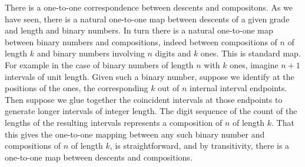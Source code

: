 \documentclass[5p,twocolumn]{elsarticle}
\begin{document}
\begin{remark}\label{rmk:descentsand compositions}
There is a one-to-one correspondence between descents and compositons. As we have seen, there is a natural one-to-one map between descents of a given grade and length and binary numbers.
In turn there is a natural one-to-one map between binary numbers and compositions, indeed between compositions of $n$ of length $k$ and binary numbers involving $n$ digits and $k$ ones.
This is standard map. For example in the case of binary numbers of length $n$ with $k$ ones, imagine $n+1$ intervals of unit length.
Given such a binary number, suppose we identify at the positions of the ones, the corresponding $k$ out of $n$ internal interval endpoints.
Then suppose we glue together the coincident intervals at those endpoints to generate longer intervals of integer length.
The digit sequence of the count of the lengths of the resulting intervals represents a composition of $n$ of length $k$.
That this gives the one-to-one mapping between any such binary number and compositions of $n$ of length $k$, is straightforward, and by transitivity,
there is a one-to-one map between descents and compositions.
\end{remark}
%
\end{document}
